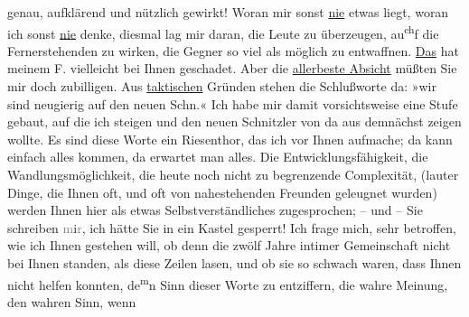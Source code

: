\begin{ledgroupsized}[t]{13cm}
{                  genau}, aufklärend und nützlich gewirkt! Woran mir sonst \uline{nie} etwas liegt, woran ich sonst \uline{nie}
               denke, diesmal lag mir daran, die Leute zu überzeugen, au\substVorne{}\textsuperscript{ch}\substDazwischen{}f\substHinten{} die Fernerstehenden zu wirken, die Gegner so viel als möglich zu entwaffnen.
                  \uline{Das} hat meinem F. vielleicht bei Ihnen geschadet. Aber die \uline{allerbeste Absicht} müßten Sie mir doch zubilligen.\pend
           \pstart
           Aus \uline{taktischen} Gründen stehen die Schlußworte da:
                  »wir sind neugierig auf den
                  neuen Schn.« Ich habe mir damit vorsichtsweise eine Stufe gebaut, auf die ich
               steigen und den neuen Schnitzler von da aus demnächst zeigen wollte. Es sind diese
               Worte ein Riesenthor, das ich vor Ihnen aufmache; da kann einfach alles kommen, da
               erwartet man alles. Die Entwicklungsfähigkeit, die Wandlungsmöglichkeit, die heute
               noch nicht zu begrenzende Complexität, (lauter Dinge, die Ihnen oft, und oft von
               nahestehenden Freunden geleugnet wurden) werden Ihnen hier als etwas
               Selbstverständliches zugesprochen; – und – Sie schreiben
                  \textcolor{gray}{m}i\textcolor{gray}{r}, ich hätte Sie in ein Kastel
               gesperrt!\pend
           \pstart
           Ich frage mich, sehr betroffen, wie ich Ihnen gestehen will, ob denn die zwölf Jahre
               intimer Gemeinschaft nicht bei Ihnen standen, als \label{K_L03353-9v}\label{K_L03353-9h} diese Zeilen lasen, und ob sie so
               schwach waren,  dass \label{K_L03353-10v}\label{K_L03353-10h} Ihnen nicht helfen konnten, de\substVorne{}\textsuperscript{m}\substDazwischen{}n\substHinten{} Sinn dieser Worte zu entziffern, die wahre Meinung, den wahren Sinn, wenn

\end{ledgroupsized}
